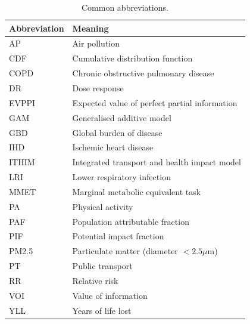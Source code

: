 \documentclass{article}
\begin{document}
\begin{table}[ht]
\begin{center}
\caption{\small Common abbreviations.}
\begin{tabular}{ll}
\label{abbrev}
Abbreviation & Meaning  \\
\hline
AP & Air pollution \\
CDF & Cumulative distribution function \\
COPD & Chronic obstructive pulmonary disease \\
DR & Dose response \\
EVPPI & Expected value of perfect partial information \\
GAM & Generalised additive model \\
GBD & Global burden of disease\\
IHD & Ischemic heart disease\\
ITHIM & Integrated transport and health impact model \\
LRI & Lower respiratory infection \\
MMET & Marginal metabolic equivalent task \\
PA & Physical activity\\
PAF & Population attributable fraction\\
PIF & Potential impact fraction\\
PM2.5 & Particulate matter (diameter $< 2.5 \mu$m)\\
PT & Public transport\\
RR & Relative risk \\
VOI & Value of information \\
YLL & Years of life lost \\
\hline
\end{tabular}
\end{center}
\end{table}
\end{document}
